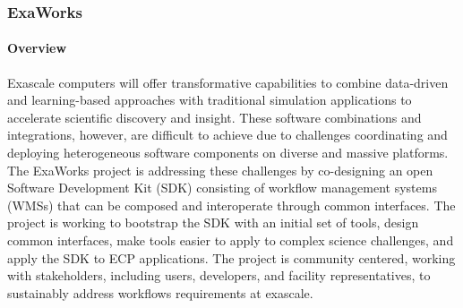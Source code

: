 
\subsubsection{ ExaWorks} \label{subsubsect:exaworks}


\paragraph{Overview} 
Exascale computers will offer transformative capabilities to combine
data-driven and learning-based approaches with traditional simulation
applications to accelerate scientific discovery and insight. These software
combinations and integrations, however, are difficult to achieve due to
challenges coordinating and deploying heterogeneous software components
on diverse and massive platforms. The ExaWorks project is addressing 
these challenges by co-designing an open Software Development Kit (SDK) 
consisting of workflow management systems (WMSs) that can be
composed and interoperate through common interfaces. 
The project is working to bootstrap the SDK with an initial
set of tools, design common interfaces, make tools
easier to apply to complex science challenges, 
and apply the SDK to ECP applications.
The project is community centered, 
working with stakeholders, including
users, developers, and facility representatives, to 
sustainably address workflows requirements at
exascale.




